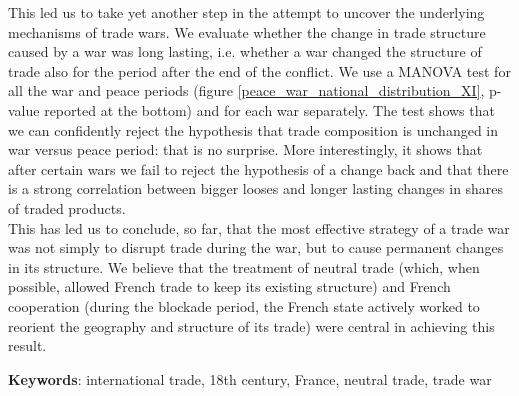 \documentclass[12pt,a4paper,notitlepage]{article}
\begin{document}
This led us to take yet another step in the attempt to uncover the underlying mechanisms of trade wars.
We evaluate whether the change in trade structure caused by a war was long lasting, i.e. whether a war changed the structure of trade also for the period after the end of the conflict.
We use a MANOVA test for all the war and peace periods (figure \ref{peace_war_national_distribution_XI}, p-value reported at the bottom) and for each war separately.
The test shows that we can confidently reject the hypothesis that trade composition is unchanged in war versus peace period: that is no surprise.
More interestingly, it shows that after certain wars we fail to reject the hypothesis of a change back and that there is a strong correlation between bigger looses and longer lasting changes in shares of traded products. \\
This has led us to conclude, so far, that the most effective strategy of a trade war was not simply to disrupt trade during the war, but to cause permanent changes in its structure.
We believe that the treatment of neutral trade (which, when possible, allowed French trade to keep its existing structure) and French cooperation (during the blockade period, the French state actively worked to reorient the geography and structure of its trade) were central in achieving this result.



\textbf{Keywords}: international trade, 18th century, France, neutral trade, trade war


\renewcommand{\baselinestretch}{1.0}\normalsize


\end{document}
